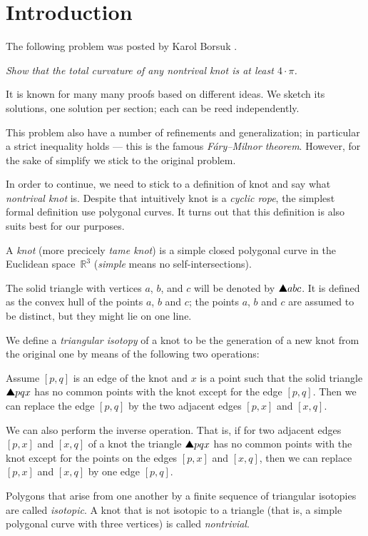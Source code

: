 \section{Introduction}

The following problem was posted by Karol Borsuk \cite{borsuk}.

\textit{Show that the total curvature of any nontrival knot is at least $4\cdot\pi$.}

It is known for many many proofs based on different ideas.
We sketch its solutions, one solution per section;
each can be reed independently.

This problem also have a number of refinements and generalization;
in particular a strict inequality holds --- this is the famous \emph{F\'ary--Milnor theorem}.
However, for the sake of simplify we stick to the original problem.

In order to continue, we need to stick to a definition of knot and say what \emph{nontrival knot} is.
Despite that intuitively knot is a \emph{cyclic rope},
the simplest formal definition use polygonal curves.
It turns out that this definition is also suits best for our purposes.

A \emph{knot} (more precicely \emph{tame knot}) is a simple closed polygonal curve in the Euclidean space~$\mathbb{R}^3$ (\emph{simple} means no self-intersections).

The solid triangle with vertices $a$, $b$, and $c$ will be denoted by $\solidtriangle abc$.
It is defined as the convex hull of the points $a$, $b$ and $c$;
the points $a$, $b$ and $c$ are assumed to be distinct, but they might lie on one line.

We define a \emph{triangular isotopy} of a knot to be the generation of a new knot from the original one by means of the
following two operations:

Assume $[p,q]$ is an edge of the knot and $x$
is a point such that the solid triangle $\solidtriangle pqx$  has no common points with the knot except for the edge $[p,q]$.
Then we can replace the edge $[p,q]$ by the two adjacent edges $[p,x]$ and $[x,q]$.

We can also perform the inverse operation.
That is, if for two adjacent edges $[p,x]$ and $[x,q]$ of a knot the triangle
$\solidtriangle pqx$ has no common points with the knot except for the points on the edges $[p,x]$ and $[x,q]$,
then we can replace $[p,x]$ and $[x,q]$ by one edge $[p,q]$.

Polygons that arise from one another by a finite sequence of
triangular isotopies are called \emph{isotopic}.
A knot that is not isotopic to a triangle (that is, a simple polygonal curve with three vertices) is called \emph{nontrivial}.

